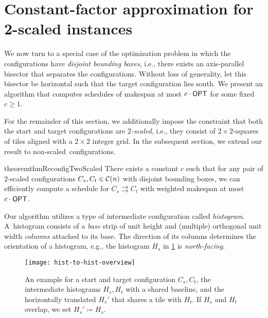 \section{Constant-factor approximation for 2-scaled instances}\label{sec:bounded-approx}

We now turn to a special case of the optimization problem
in which the configurations have \emph{disjoint bounding boxes}, i.e., there exists an axis-parallel bisector that separates the configurations.
Without loss of generality, let this bisector be horizontal such that the target configuration lies south.
We present an algorithm that computes schedules of makespan at most $c\cdot \textsf{OPT}$ for some fixed $c\geq 1$.

For the remainder of this section, we additionally impose the constraint that both the start and target configurations are \emph{$2$\nobreakdash-scaled}, i.e., they consist of $2 \times 2$-squares of tiles
aligned with a $2\times 2$ integer grid.
In the subsequent section, we extend our result to non-scaled~configurations.

\begin{restatable}{theorem}{thmReconfigTwoScaled}
    \label{thm:reconfig-2-scaled}
    There exists a constant $c$
    such that for any pair of $2$-scaled configurations $C_s,C_t\in \mathcal{C}(n)$ with disjoint bounding boxes, we can efficiently compute a schedule for $C_s\rightrightarrows C_t$ with weighted makespan at most $c\cdot \textsf{OPT}$.
\end{restatable}

Our algorithm utilizes a type of intermediate configuration called \emph{histogram}.
A~histogram consists of a \emph{base} strip of unit height and (multiple) orthogonal unit width \emph{columns} attached to its base.
The direction of its columns determines the orientation of a histogram, e.g., the histogram $H_s$ in \cref{fig:hist-to-hist} is \emph{north-facing}.

\begin{figure}[htb]
	\centering%
	\texttt{[image: hist-to-hist-overview]}%
	\caption{
		An example for a start and target configuration $C_s, C_t$, the intermediate histograms $H_s, H_t$ with a shared baseline, and the horizontally translated $H_s'$ that shares a tile with $H_t$.
		If $H_s$ and $H_t$ overlap, we set $H_s' \coloneqq H_s$.
	}
	\label{fig:hist-to-hist}
\end{figure}

